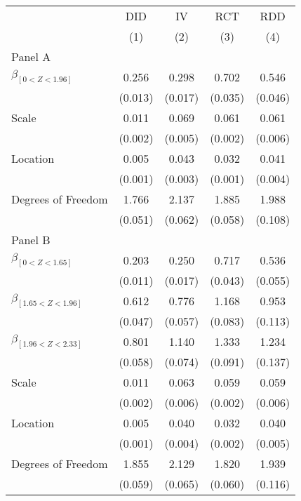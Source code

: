 \def\sym#1{\ifmmode^{#1}\else\(^{#1}\)\fi}
\begin{tabular}{l*{4}{c}}
\hline\hline
& \multicolumn{1}{c}{DID} &  \multicolumn{1}{c}{IV} &  \multicolumn{1}{c}{RCT} &  \multicolumn{1}{c}{RDD}\\

& \multicolumn{1}{c}{(1)} &  \multicolumn{1}{c}{(2)} &  \multicolumn{1}{c}{(3)} &  \multicolumn{1}{c}{(4)}\\

\hline
\hline

Panel A \\

$\beta_{[0 < Z < 1.96]}$ & 0.256 &  0.298 &  0.702 &  0.546\\
& (0.013) &  (0.017) &  (0.035) &  (0.046)\\

Scale & 0.011 &  0.069 &  0.061 &  0.061\\
& (0.002) &  (0.005) &  (0.002) &  (0.006)
\\

Location & 0.005 &  0.043 &  0.032 &  0.041\\
& (0.001) &  (0.003) &  (0.001) &  (0.004)
\\

Degrees of Freedom & 1.766 &  2.137 &  1.885 &  1.988\\
& (0.051) &  (0.062) &  (0.058) &  (0.108)\\
Panel B \\

$\beta_{[0 < Z < 1.65]}$ & 0.203 &  0.250 &  0.717 &  0.536\\
& (0.011) &  (0.017) &  (0.043) &  (0.055)\\

$\beta_{[1.65 < Z < 1.96]}$ & 0.612 &  0.776 &  1.168 &  0.953\\
& (0.047) &  (0.057) &  (0.083) &  (0.113)\\


$\beta_{[1.96 < Z < 2.33]}$ & 0.801 &  1.140 &  1.333 &  1.234\\
& (0.058) &  (0.074) &  (0.091) &  (0.137)\\

Scale & 0.011 &  0.063 &  0.059 &  0.059\\
& (0.002) &  (0.006) &  (0.002) &  (0.006)
\\

Location & 0.005 &  0.040 &  0.032 &  0.040\\
& (0.001) &  (0.004) &  (0.002) &  (0.005)
\\

Degrees of Freedom & 1.855 &  2.129 &  1.820 &  1.939\\
& (0.059) &  (0.065) &  (0.060) &  (0.116)\\

\hline\hline
\end{tabular}

